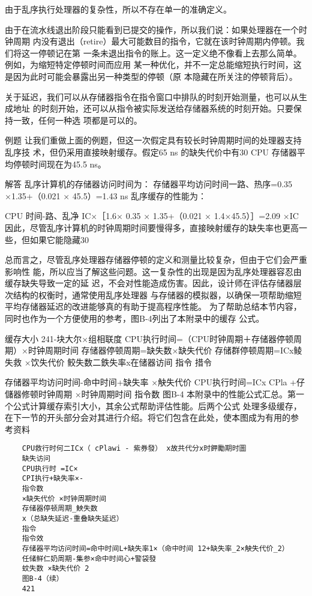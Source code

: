 由于乱序执行处理器的复杂性，所以不存在单一的准确定义。

由于在流水线退出阶段只能看到已提交的操作，所以我们说：如果处理器在一个时钟周期
内没有退出（retire）最大可能数目的指令，它就在该时钟周期内停顿。我们将这一停顿记在第
一条未退出指令的账上。这一定义绝不像看上去那么简单。例如，为缩短特定停顿时间而应用
某一种优化，并不一定总能缩短执行时间，这是因为此时可能会暴露出另一种类型的停顿（原
本隐藏在所关注的停顿背后）。

关于延迟，我们可以从存储器指令在指令窗口中排队的时刻开始测量，也可以从生成地址
的时刻开始，还可以从指令被实际发送给存储器系统的时刻开始。只要保持一致，任何一种选
项都是可以的。

例题
让我们重做上面的例题，但这一次假定具有较长时钟周期时间的处理器支持乱序技
术，但仍采用直接映射缓存。假定65 ns 的缺失代价中有30%
CPU 存储器平均停顿时间现在为45.5 ns。

解答
乱序计算机的存储器访问时间为：
存储器平均访问时间一路、热序=0.35 ×1.35+（0.021 × 45.5）=1.43 ns
乱序缓存的性能为：

CPU 时间-路、乱净 IC×［1.6× 0.35 × 1.35+（0.021 × 1.4×45.5）］=2.09 ×IC
因此，尽管乱序计算机的时钟周期时间要慢得多，直接映射缓存的缺失率也更高一
些，但如果它能隐藏30%

总而言之，尽管乱序处理器存储器停顿的定义和测量比较复杂，但由于它们会严重影响性
能，所以应当了解这些问题。这一复杂性的出现是因为乱序处理器容忍由缓存缺失导致一定的延
迟，不会对性能造成伤害。因此，设计师在评估存储器层次结构的权衡时，通常使用乱序处理器
与存储器的模拟器，以确保一项帮助缩短平均存储器延迟的改进能够真的有助于提高程序性能。
为了帮助总结本节内容，同时也作为一个方便使用的参考，图B-4列出了本附录中的缓存
公式。

缓存大小
241-块大尔×组相联度
CPU执行时间=（CPU时钟周期＋存储器停顿周期）×时钟周期时间
存储器停顿周期=缺失数×缺失代价
存储群停顿周期=ICx鲮失救 ×饮失代价
鲛失数二鉄失率x在储器访间
指令
措令

存储器平均访问时间-命中时间+缺失率 ×觖失代价
CPU执行时间=ICx CPla +仔儲器修顿时钟周期
×时钟周期时间
指令数
图B-4 本附录中的性能公式汇总。第一个公式计算缓存索引大小，其余公式帮助评估性能。后两个公式
处理多级缓存，在下一节的开头部分会对其进行介绍。将它们包含在此处，使本图成为有用的参
考资料

\begin{verbatim}
    CPU救行时何二ICx（ cPlawi - 紫券發） x故共代分x时鉀勵期时圖
    缺失访问
    CPU执行时 =IC×
    CPI执行+缺失率×-
    指令数
    ×缺失代价 ×时钟周期时间
    存储器停顿周期_䱀失数
    x（总缺失延迟-重叠缺失延迟）
    指令
    指令效
    存储器平均访问时间=命中时间L+缺失率1×（命中时间 12+缺失率_2×觖失代价_2）
    任储鲜仁奶周期-集参×命中时间心+警袋發
    蚊失数 ×缺失代价 2
    图B-4（续）
    421
\end{verbatim}

